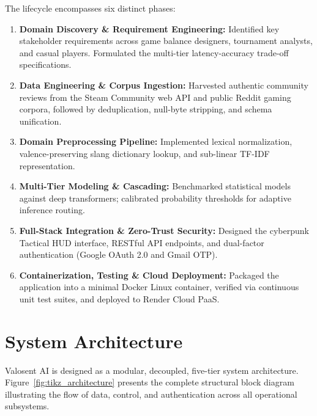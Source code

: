 The lifecycle encompasses six distinct phases:
\begin{enumerate}
    \item \textbf{Domain Discovery \& Requirement Engineering:} Identified key stakeholder requirements across game balance designers, tournament analysts, and casual players. Formulated the multi-tier latency-accuracy trade-off specifications.
    \item \textbf{Data Engineering \& Corpus Ingestion:} Harvested authentic community reviews from the Steam Community web API and public Reddit gaming corpora, followed by deduplication, null-byte stripping, and schema unification.
    \item \textbf{Domain Preprocessing Pipeline:} Implemented lexical normalization, valence-preserving slang dictionary lookup, and sub-linear TF-IDF representation.
    \item \textbf{Multi-Tier Modeling \& Cascading:} Benchmarked statistical models against deep transformers; calibrated probability thresholds for adaptive inference routing.
    \item \textbf{Full-Stack Integration \& Zero-Trust Security:} Designed the cyberpunk Tactical HUD interface, RESTful API endpoints, and dual-factor authentication (Google OAuth 2.0 and Gmail OTP).
    \item \textbf{Containerization, Testing \& Cloud Deployment:} Packaged the application into a minimal Docker Linux container, verified via continuous unit test suites, and deployed to Render Cloud PaaS.
\end{enumerate}

\section{System Architecture}
\label{sec:system_architecture}

Valosent AI is designed as a modular, decoupled, five-tier system architecture. Figure~\ref{fig:tikz_architecture} presents the complete structural block diagram illustrating the flow of data, control, and authentication across all operational subsystems.

